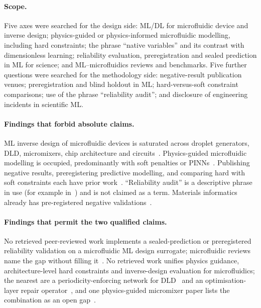 \documentclass[11pt,a4paper]{article}
\begin{document}
\paragraph{Scope.} Five axes were searched for the design side: ML/DL for
microfluidic device and inverse design; physics-guided or physics-informed
microfluidic modelling, including hard constraints; the phrase ``native
variables'' and its contrast with dimensionless learning; reliability evaluation, preregistration and sealed prediction in ML for science; and ML--microfluidics
reviews and benchmarks. Five further questions were searched for the
methodology side: negative-result publication venues; preregistration and
blind holdout in ML; hard-versus-soft constraint comparisons; use of the
phrase ``reliability audit''; and disclosure of engineering incidents in
scientific ML.

\paragraph{Findings that forbid absolute claims.} ML inverse design of
microfluidic devices is saturated across droplet generators, DLD, micromixers,
chip architecture and circuits~\cite{lashkaripour2024,vatandoust2022,
samari2025,li2026pathchip,mufg2026,ceyehao2026}. Physics-guided microfluidic
modelling is occupied, predominantly with soft penalties or
PINNs~\cite{bpgnn2026,flexpinn2026}. Publishing negative results, preregistering
predictive modelling, and comparing hard with soft constraints each have
prior work~\cite{karl2024,hofman2023,naturecs2021,baty2023,prnet2026}.
``Reliability audit'' is a descriptive phrase in use (for example
in~\cite{schulam2019}) and is not claimed as a term. Materials
informatics already has pre-registered negative validations~\cite{vepa2026}.

\paragraph{Findings that permit the two qualified claims.} No retrieved
peer-reviewed work implements a sealed-prediction or preregistered reliability validation on a microfluidic ML design surrogate; microfluidic reviews name the gap
without filling it~\cite{labchip2025review,das2025}. No retrieved work unifies
physics guidance, architecture-level hard constraints and inverse-design
evaluation for microfluidics; the nearest are a periodicity-enforcing network
for DLD~\cite{lee2025} and an optimisation-layer repair
operator~\cite{micromixer2026}, and one physics-guided micromixer paper lists
the combination as an open gap~\cite{bpgnn2026}.
\end{document}
